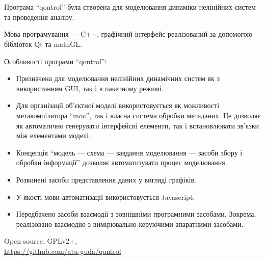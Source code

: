 \documentclass[14pt,handout,utf8]{beamer}
\newcommand{\Xhead}[1]{
 \begin{center}%
      \textbf{#1}%
 \end{center}%
}
\begin{document}

\begin{frame}
  \frametitle{~}

  Програма ``qontrol'' була створена для моделювання динаміки
  нелінійних систем та проведення аналізу.

  Мова програмування --- C++,
  графічний інтерфейс реалізований за допомогою
  бібліотек Qt та mathGL.

  \Xhead{}
  Особливості програми ``qontrol'':

  \begin{itemize}

    \item
      Призначена для моделювання нелінійних динамічних систем як з
      використанням GUI, так і в пакетному режимі.

    \item
      Для організації об'єктної моделі використовується як можливості
      метакомпілятора ``moc'', так і власна система обробки метаданих. Це
      дозволяє як автоматично генерувати інтерфейсні елементи, так
      і встановлювати зв'язки між елементами моделі.

    \item
      Концепція ``модель --- схема --- завдання моделювання --- засоби збору і обробки інформації''
      дозволяє автоматизувати процес
      моделювання.

    \item
     Розвинені засоби представлення даних у вигляді графіків.

    \item
      У якості мови автоматизації використовується Javascript.

    \item
      Передбачено засоби взаємодії з зовнішніми програмними
      засобами. Зокрема, реалізовано взаємодію з
      вимірювально-керуючими апаратними засобами.


  \end{itemize}

  Open source, GPLv2+, \\
  \url{https://github.com/atu-guda/qontrol}


\end{frame}



\end{document}
